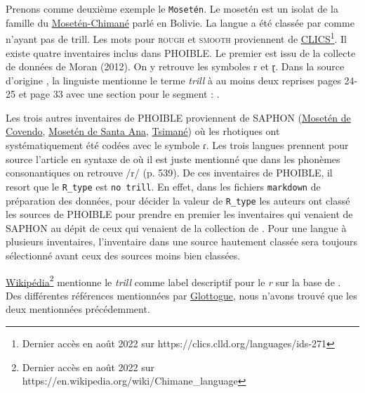 Prenons comme deuxième exemple le \texttt{Mosetén}. Le mosetén est un isolat de la famille du \href{https://glottolog.org/resource/languoid/id/mose1249}{Mosetén-Chimané} parlé en Bolivie. La langue a été classée par \textcite{winterTrilledAssociatedRoughness2022} comme n'ayant pas de trill. Les mots pour \textsc{rough} et \textsc{smooth} proviennent de \href{https://clics.clld.org/languages/ids-271}{CLICS\footnote{Dernier accès en août 2022 sur \url{https://clics.clld.org/languages/ids-271}}}. Il existe quatre inventaires inclus dans PHOIBLE. Le premier est issu de la collecte de données de Moran (2012). On y retrouve les symboles r et ɽ. Dans la source d'origine \parencite{sakelGrammarMoseten2004}, la linguiste mentionne le terme \textit{trill} à au moins deux reprises pages 24-25  et page 33 avec une section pour le segment : .

Les trois autres inventaires de PHOIBLE proviennent de SAPHON (\href{https://linguistics.berkeley.edu/saphon/en/inv/MosetenC.html}{Mosetén de Covendo}, \href{https://linguistics.berkeley.edu/saphon/en/inv/MosetenSA.html}{Mosetén de Santa Ana}, \href{https://linguistics.berkeley.edu/saphon/en/inv/Tsimane.html}{Tsimané}) où les rhotiques ont systématiquement été codées avec le symbole ɾ. Les trois langues prennent pour source l'article en syntaxe de \textcite{sakelMosetenChimaneArgument2011} où il est juste mentionné que dans les phonèmes consonantiques on retrouve /r/ (p. 539).
De ces inventaires de PHOIBLE, il resort que le \texttt{R\_type} est \texttt{no trill}. En effet, dans les fichiers \texttt{markdown} de préparation des données, pour décider la valeur de \texttt{R\_type} les auteurs ont classé les sources de PHOIBLE pour prendre en premier les inventaires qui venaient de SAPHON \parencite{saphon} au dépit de ceux qui venaient de la collection de \textcite{moran_etal2014}. Pour une langue à plusieurs inventaires, l'inventaire dans une source hautement classée sera toujours sélectionné avant ceux des sources moins bien classées.

\href{https://en.wikipedia.org/wiki/Chimane_language}{Wikipédia\footnote{Dernier accès en août 2022 sur \url{https://en.wikipedia.org/wiki/Chimane_language}}} mentionne le \textit{trill} comme label descriptif pour le \textit{r} sur la base de \textcite{sakelGrammarMoseten2004}.
Des différentes références mentionnées par \href{https://glottolog.org/resource/languoid/id/mose1249}{Glottogue}, nous n'avons trouvé que les deux mentionnées précédemment.

